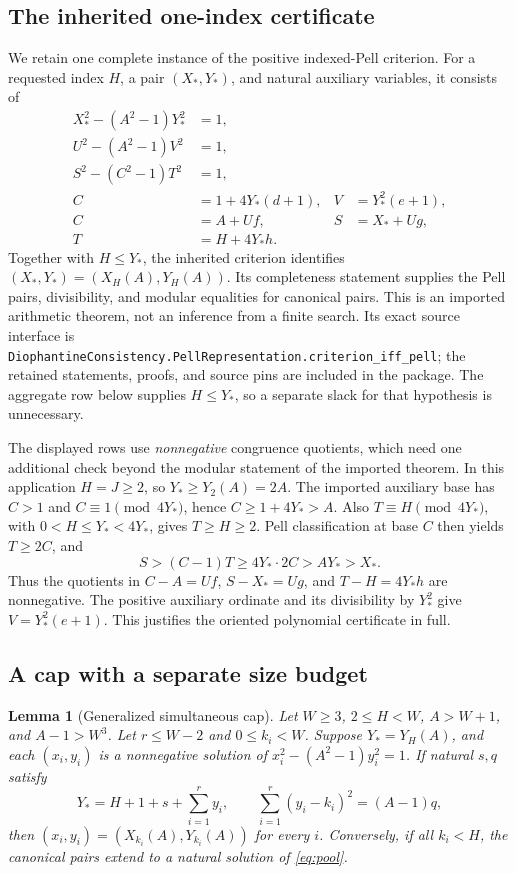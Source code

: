\documentclass[11pt,a4paper]{article}
\newtheorem{lemma}[theorem]{Lemma}
\theoremstyle{remark}
\newcommand{\qref}[1]{\nolinkurl{#1}}
\begin{document}
\subsection{The inherited one-index certificate}

We retain one complete instance of the positive indexed-Pell criterion.
For a requested index \(H\), a pair \((X_*,Y_*)\), and natural auxiliary
variables, it consists of
\begin{align}
 X_*^2-(A^2-1)Y_*^2&=1,\nonumber\\
 U^2-(A^2-1)V^2&=1,\nonumber\\
 S^2-(C^2-1)T^2&=1,\nonumber\\
 C&=1+4Y_*(d+1), &V&=Y_*^2(e+1),\label{eq:indexcriterion}\\
 C&=A+Uf, &S&=X_*+Ug,\nonumber\\
 T&=H+4Y_*h.\nonumber
\end{align}
Together with \(H\le Y_*\), the inherited criterion identifies
\((X_*,Y_*)=(X_H(A),Y_H(A))\). Its completeness statement supplies the
Pell pairs, divisibility, and modular equalities for canonical pairs.
This is an imported arithmetic
theorem, not an inference from a finite search. Its exact source interface
is \qref{DiophantineConsistency.PellRepresentation.criterion_iff_pell};
the retained statements, proofs, and source pins are included in the package.
The aggregate row below supplies \(H\le Y_*\), so a separate slack for
that hypothesis is unnecessary.

The displayed rows use \emph{nonnegative} congruence quotients, which need
one additional check beyond the modular statement of the imported theorem.
In this application \(H=J\ge2\), so \(Y_*\ge Y_2(A)=2A\).
The imported auxiliary base has \(C>1\) and
\(C\equiv1\pmod{4Y_*}\), hence \(C\ge1+4Y_*>A\).
Also \(T\equiv H\pmod{4Y_*}\), with \(0<H\le Y_*<4Y_*\), gives
\(T\ge H\ge2\). Pell classification at base \(C\) then yields
\(T\ge2C\), and
\[
 S>(C-1)T\ge4Y_*\cdot2C>AY_*>X_*.
\]
Thus the quotients in \(C-A=Uf\), \(S-X_*=Ug\), and
\(T-H=4Y_*h\) are nonnegative. The positive auxiliary ordinate and its
divisibility by \(Y_*^2\) give \(V=Y_*^2(e+1)\). This justifies the
oriented polynomial certificate in full.

\subsection{A cap with a separate size budget}

\begin{lemma}[Generalized simultaneous cap]\label{lem:cap}
Let \(W\ge3\), \(2\le H<W\), \(A>W+1\), and \(A-1>W^3\). Let
\(r\le W-2\) and \(0\le k_i<W\). Suppose \(Y_*=Y_H(A)\), and each
\((x_i,y_i)\) is a nonnegative solution of
\(x_i^2-(A^2-1)y_i^2=1\). If natural \(s,q\) satisfy
\begin{equation}\label{eq:pool}
 Y_*=H+1+s+\sum_{i=1}^r y_i,
 \qquad
 \sum_{i=1}^r(y_i-k_i)^2=(A-1)q,
\end{equation}
then \((x_i,y_i)=(X_{k_i}(A),Y_{k_i}(A))\) for every \(i\).
Conversely, if all \(k_i<H\), the canonical pairs extend to a natural
solution of \eqref{eq:pool}.
\end{lemma}
\end{document}
